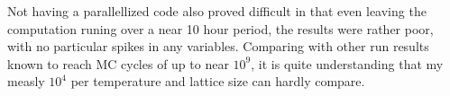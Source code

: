 \documentclass[10pt, twocolumn]{revtex4-1}
\begin{document}
Not having a parallellized code also proved difficult in that even leaving the computation runing over a near 10 hour period, the results were rather poor,
with no particular spikes in any variables. Comparing with other run results known to reach MC cycles of up to near $10^9$, it is quite understanding that
my measly $10^4$ per temperature and lattice size can hardly compare.



\end{document}
